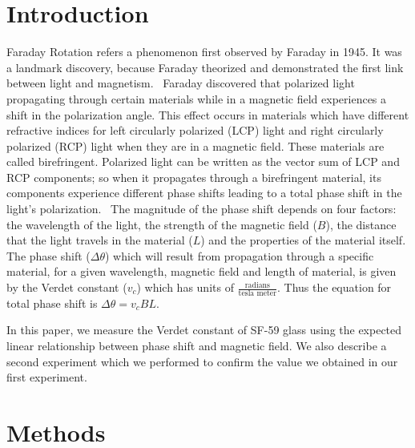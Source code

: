 \documentclass[prb,preprint]{revtex4-1}
\begin{document}
\maketitle %


\section{Introduction} %

Faraday Rotation refers a phenomenon first observed by Faraday in 1945. It was a landmark discovery, because Faraday theorized and demonstrated the first link between light and magnetism.~\cite{teachspin} Faraday discovered that polarized light propagating through certain materials while in a magnetic field experiences a shift in the polarization angle. This effect occurs in materials which have different refractive indices for left circularly polarized (LCP) light and right circularly polarized (RCP) light when they are in a magnetic field. These materials are called birefringent. Polarized light can be written as the vector sum of LCP and RCP components; so when it propagates through a birefringent material, its components experience different phase shifts leading to a total phase shift in the light's polarization.~\cite{melissanos} The magnitude of the phase shift depends on four factors: the wavelength of the light, the strength of the magnetic field ($B$), the distance that the light travels in the material ($L$) and the properties of the material itself. The phase shift ($\Delta\theta$) which will result from propagation through a specific material, for a given wavelength, magnetic field and length of material, is given by the Verdet constant ($v_c$) which has units of $\frac{\text{radians}}{\text{tesla\ meter}}$. Thus the equation for total phase shift is $\Delta \theta = v_c B L$.



In this paper, we measure the Verdet constant of SF-59 glass using the expected linear relationship between phase shift and magnetic field. We also describe a second experiment which we performed to confirm the value we obtained in our first experiment.


\section{Methods}
\end{document}
